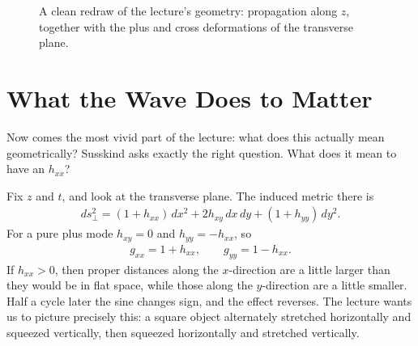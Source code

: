 \begin{figure}[t]
\centering
{}
\caption{A clean redraw of the lecture's geometry: propagation along \(z\), together with the plus and cross deformations of the transverse plane.}
\end{figure}

\section{What the Wave Does to Matter}

Now comes the most vivid part of the lecture: what does this actually mean geometrically? Susskind asks exactly the right question. What does it mean to have an \(h_{xx}\)?

Fix \(z\) and \(t\), and look at the transverse plane. The induced metric there is
\begin{align}
ds_{\perp}^{2}
=
(1+h_{xx})\,dx^{2}
+
2h_{xy}\,dx\,dy
+
(1+h_{yy})\,dy^{2}.
\end{align}
For a pure plus mode \(h_{xy}=0\) and \(h_{yy}=-h_{xx}\), so
\begin{align}
g_{xx}=1+h_{xx},
\qquad
g_{yy}=1-h_{xx}.
\end{align}
If \(h_{xx}>0\), then proper distances along the \(x\)-direction are a little larger than they would be in flat space, while those along the \(y\)-direction are a little smaller. Half a cycle later the sine changes sign, and the effect reverses. The lecture wants us to picture precisely this: a square object alternately stretched horizontally and squeezed vertically, then squeezed horizontally and stretched vertically.

